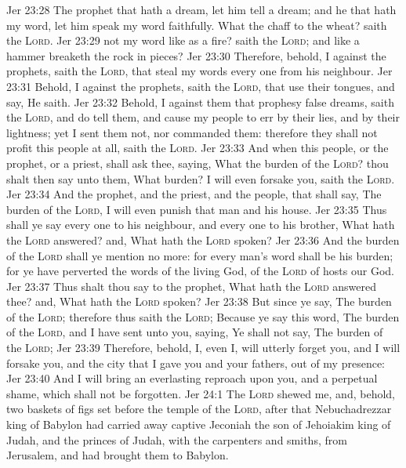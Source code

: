 \vs Jer 23:28 The prophet that hath a dream, let him tell a dream; and he that hath my word, let him speak my word faithfully. What  the chaff to the wheat? saith the \textsc{Lord}.
\vs Jer 23:29  not my word like as a fire? saith the \textsc{Lord}; and like a hammer  breaketh the rock in pieces?
\vs Jer 23:30 Therefore, behold, I  against the prophets, saith the \textsc{Lord}, that steal my words every one from his neighbour.
\vs Jer 23:31 Behold, I  against the prophets, saith the \textsc{Lord}, that use their tongues, and say, He saith.
\vs Jer 23:32 Behold, I  against them that prophesy false dreams, saith the \textsc{Lord}, and do tell them, and cause my people to err by their lies, and by their lightness; yet I sent them not, nor commanded them: therefore they shall not profit this people at all, saith the \textsc{Lord}.
\vs Jer 23:33 And when this people, or the prophet, or a priest, shall ask thee, saying, What  the burden of the \textsc{Lord}? thou shalt then say unto them, What burden? I will even forsake you, saith the \textsc{Lord}.
\vs Jer 23:34 And  the prophet, and the priest, and the people, that shall say, The burden of the \textsc{Lord}, I will even punish that man and his house.
\vs Jer 23:35 Thus shall ye say every one to his neighbour, and every one to his brother, What hath the \textsc{Lord} answered? and, What hath the \textsc{Lord} spoken?
\vs Jer 23:36 And the burden of the \textsc{Lord} shall ye mention no more: for every man's word shall be his burden; for ye have perverted the words of the living God, of the \textsc{Lord} of hosts our God.
\vs Jer 23:37 Thus shalt thou say to the prophet, What hath the \textsc{Lord} answered thee? and, What hath the \textsc{Lord} spoken?
\vs Jer 23:38 But since ye say, The burden of the \textsc{Lord}; therefore thus saith the \textsc{Lord}; Because ye say this word, The burden of the \textsc{Lord}, and I have sent unto you, saying, Ye shall not say, The burden of the \textsc{Lord};
\vs Jer 23:39 Therefore, behold, I, even I, will utterly forget you, and I will forsake you, and the city that I gave you and your fathers,  out of my presence:
\vs Jer 23:40 And I will bring an everlasting reproach upon you, and a perpetual shame, which shall not be forgotten.
\vs Jer 24:1 The \textsc{Lord} shewed me, and, behold, two baskets of figs  set before the temple of the \textsc{Lord}, after that Nebuchadrezzar king of Babylon had carried away captive Jeconiah the son of Jehoiakim king of Judah, and the princes of Judah, with the carpenters and smiths, from Jerusalem, and had brought them to Babylon.
